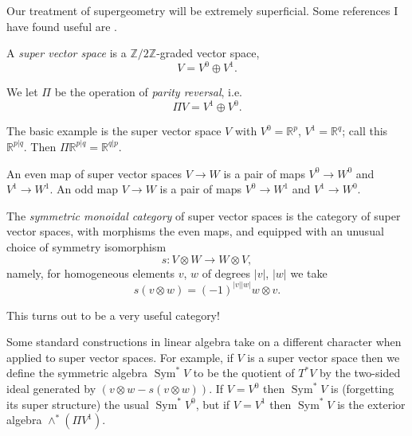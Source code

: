 \documentclass[12pt,letterpaper,reqno]{article}
\numberwithin{equation}{section}
\newcommand{\R}{\ensuremath{\mathbb R}}
\newcommand{\Z}{\ensuremath{\mathbb Z}}
\newcommand{\abs}[1]{\lvert#1\rvert}
\newcommand{\ti}[1]{\textit{#1}}
\DeclareMathOperator{\Sym}{Sym}
\begin{document}
Our treatment of supergeometry will be extremely superficial. Some references
I have found useful are \cite{Deligne1999b,etingof,Witten2012,Zakharevich2017}.

\begin{defn} A \ti{super vector space} is a $\Z/2\Z$-graded vector space,
\begin{equation}
  V = V^0 \oplus V^1.
\end{equation}
\end{defn}

We let $\Pi$ be the operation of \ti{parity reversal}, i.e.
\begin{equation}
  \Pi V = V^1 \oplus V^0.
\end{equation}

\begin{example}The basic example is the super vector space $V$
with $V^0 = \R^p$, $V^1 = \R^q$; call this $\R^{p \vert q}$.
Then $\Pi \R^{p \vert q} = \R^{q \vert p}$.
\end{example}

\begin{defn} An even map of super vector spaces
$V \to W$ is a pair of maps $V^0 \to W^0$ and $V^1 \to W^1$.
An odd map $V \to W$ is a pair of maps $V^0 \to W^1$ and $V^1 \to W^0$.
\end{defn}

\begin{defn}
The \ti{symmetric monoidal category} of super vector spaces 
is the category of super vector spaces, with morphisms the even maps,
and equipped with an unusual choice of symmetry isomorphism
\begin{equation}
  s: V \otimes W \to W \otimes V,
\end{equation}
namely, for homogeneous elements $v$, $w$ of degrees $\abs{v}$, $\abs{w}$
we take
\begin{equation}
  s (v \otimes w) = (-1)^{\abs{v} \abs{w}} w \otimes v.
\end{equation}
\end{defn}
This turns out to be a very useful category!

Some standard constructions in linear algebra take on a different
character when applied to super vector spaces. For example,
if $V$ is a super vector space then we define the symmetric 
algebra $\Sym^* V$ to be the quotient of $T^* V$ by
the two-sided ideal generated by $(v \otimes w - s(v \otimes w))$.
If $V = V^0$ then $\Sym^*V$ is (forgetting its super structure) 
the usual $\Sym^* V^0$,
but if $V = V^1$ then $\Sym^* V$ is the exterior algebra $\wedge^* (\Pi V^1)$.
\end{document}
